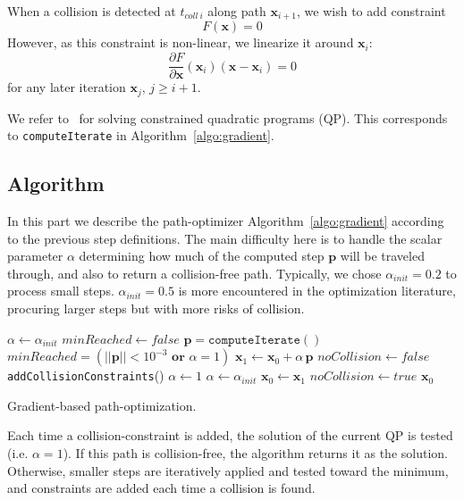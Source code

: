 \documentclass{tADR2e}
\newcommand\p{\mathbf{p}}
\newcommand\xx{\mathbf{x}}
\newcommand\tcolli{t_{coll\ i}}
\begin{document}
When a collision is detected at $\tcolli$ along path $\xx_{i+1}$, we wish to add
constraint
\begin{equation}\label{eq:non-linear constraint}
F (\xx) = 0
\end{equation}
However, as this constraint is non-linear, we linearize it around $\xx_i$:
$$
\frac{\partial F}{\partial \xx}(\xx_i)(\xx -\xx_i) = 0
$$
for any later iteration $\xx_j$, $j\geq i+1$.

We refer to~\cite{nocedal2006numerical} for solving constrained quadratic 
programs (QP). This corresponds to \texttt{computeIterate} in Algorithm~\ref{algo:gradient}.


\subsection{Algorithm}

In this part we describe the path-optimizer Algorithm~\ref{algo:gradient} 
according to the previous step definitions. The main difficulty here is to handle 
the scalar parameter $\alpha$ determining how much of the computed step $\p$ will 
be traveled through, and also to return a collision-free path. Typically, we 
chose $\alpha_{init} = 0.2$ to process small steps. $\alpha_{init} = 0.5$ is more 
encountered in the optimization literature, procuring larger steps but with more 
risks of collision.

\begin{algorithm}
\begin{algorithmic}%
\Procedure{Optimize}{$\xx_0$}
	\State $\alpha \gets \alpha_{init}$
	\State $minReached \gets false$
		\State $\p = \texttt{computeIterate}()$
		\State $minReached = (||\p||<10^{-3} \textbf{ or } \alpha=1)$
		\State $\xx_1 \gets \xx_0 + \alpha\,\p$
		\If{(\textbf{not}(\texttt{validatePath($\xx_1$)}))}
			\State $noCollision \gets false$
				\State \texttt{addCollisionConstraints}()
				\State $\alpha \gets 1$
			\Else
				\State $\alpha \gets \alpha_{init}$
			\EndIf
		\Else
			\State $\xx_0 \gets \xx_1$
			\State $noCollision \gets true$
		\EndIf
	\EndWhile
	\Return $\xx_0$
\EndProcedure
\end{algorithmic}
\caption{Gradient-based path-optimization.} \label{algo:gradient}
\end{algorithm}

Each time a collision-constraint is added, 
the solution of the current QP is tested (i.e. $\alpha = 1$). If this path is collision-free, the algorithm returns it as the solution. Otherwise, 
smaller steps are iteratively applied and tested toward the minimum, and constraints are added each time a collision is found.
\end{document}
